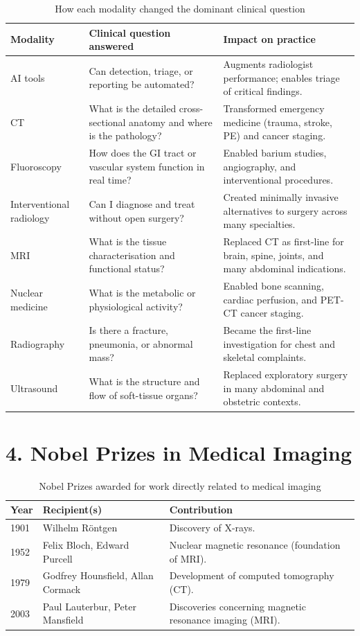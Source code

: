 \begin{table}[h]
\centering
\caption{How each modality changed the dominant clinical question}
\begin{tabular}{|p{3cm}|p{5cm}|p{5cm}|}
\hline
\textbf{Modality} & \textbf{Clinical question answered} & \textbf{Impact on practice} \\
\hline
AI tools & Can detection, triage, or reporting be automated? & Augments radiologist performance; enables triage of critical findings. \\
\hline
CT & What is the detailed cross-sectional anatomy and where is the pathology? & Transformed emergency medicine (trauma, stroke, PE) and cancer staging. \\
\hline
Fluoroscopy & How does the GI tract or vascular system function in real time? & Enabled barium studies, angiography, and interventional procedures. \\
\hline
Interventional radiology & Can I diagnose and treat without open surgery? & Created minimally invasive alternatives to surgery across many specialties. \\
\hline
MRI & What is the tissue characterisation and functional status? & Replaced CT as first-line for brain, spine, joints, and many abdominal indications. \\
\hline
Nuclear medicine & What is the metabolic or physiological activity? & Enabled bone scanning, cardiac perfusion, and PET-CT cancer staging. \\
\hline
Radiography & Is there a fracture, pneumonia, or abnormal mass? & Became the first-line investigation for chest and skeletal complaints. \\
\hline
Ultrasound & What is the structure and flow of soft-tissue organs? & Replaced exploratory surgery in many abdominal and obstetric contexts. \\
\hline
\end{tabular}
\end{table}


\section*{4. Nobel Prizes in Medical Imaging}
\begin{table}[h]
\centering
\caption{Nobel Prizes awarded for work directly related to medical imaging}
\begin{tabular}{|l|l|p{5cm}|}
\hline
\textbf{Year} & \textbf{Recipient(s)} & \textbf{Contribution} \\
\hline
1901 & Wilhelm R\"{o}ntgen & Discovery of X-rays. \\
\hline
1952 & Felix Bloch, Edward Purcell & Nuclear magnetic resonance (foundation of MRI). \\
\hline
1979 & Godfrey Hounsfield, Allan Cormack & Development of computed tomography (CT). \\
\hline
2003 & Paul Lauterbur, Peter Mansfield & Discoveries concerning magnetic resonance imaging (MRI). \\
\hline
\end{tabular}
\end{table}


